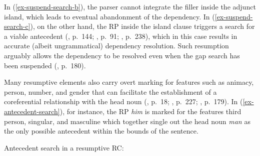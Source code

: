 \noindent In (\ref{ex-suspend-search-b}), the parser cannot integrate the filler inside the adjunct island, which leads to eventual abandonment of the dependency. In (\ref{ex-suspend-search-c}), on the other hand, the RP inside the island clause triggers a search for a viable antecedent (\cite{alexopoulou.keller2007}, p.~144; \cite{erteschik-shir1992}, p.~91; \cite{hofmeister.norcliffe2013}, p.~238), which in this case results in accurate (albeit ungrammatical) dependency resolution. Such resumption arguably allows the dependency to be resolved even when the gap search has been suspended (\cite{meltzer-asscher2021}, p.~180). 

Many resumptive elements also carry overt marking for features such as animacy, person, number, and gender that can facilitate the establishment of a coreferential relationship with the head noun (\cite{beltrama.xiang2016}, p.~18; \cite{hofmeister.norcliffe2013}, p.~227; \cite{meltzer-asscher2021}, p.~179). In (\ref{ex-antecedent-search}), for instance, the RP \textit{him} is marked for the features third person, singular, and masculine which together single out the head noun \textit{man} as the only possible antecedent within the bounds of the sentence.

\ex\label{ex-antecedent-search}Antecedent search in a resumptive RC:\par\nobreak
{}
\xe 

